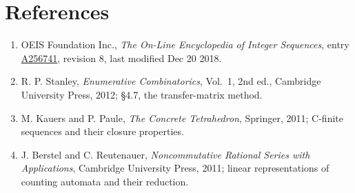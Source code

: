 \documentclass[11pt]{article}
\theoremstyle{definition}
\begin{document}
\section{References}

\begin{enumerate}

\item OEIS Foundation Inc., \emph{The On-Line Encyclopedia of Integer Sequences}, entry \href{https://oeis.org/A256741}{A256741}, revision 8, last modified Dec 20 2018.

\item R. P. Stanley, \emph{Enumerative Combinatorics}, Vol.~1, 2nd ed., Cambridge University Press, 2012; \S4.7, the transfer-matrix method.

\item M. Kauers and P. Paule, \emph{The Concrete Tetrahedron}, Springer, 2011; C-finite sequences and their closure properties.

\item J. Berstel and C. Reutenauer, \emph{Noncommutative Rational Series with Applications}, Cambridge University Press, 2011; linear representations of counting automata and their reduction.

\end{enumerate}
\end{document}

